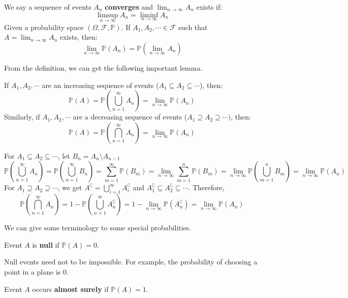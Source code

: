 \documentclass{huhtakm-template-book}
\newcommand{\prob}{\mathbb{P}}
\begin{document}
\begin{defn}
	We say a sequence of events $A_{n}$ \textbf{converges} and $\lim_{n\to\infty}A_{n}$ exists if:
	\begin{equation*}
		\limsup_{n\to\infty}A_{n}=\liminf_{n\to\infty}A_{n}
	\end{equation*}
	Given a probability space $(\Omega,\mathcal{F},\prob)$. If $A_{1},A_{2},\cdots\in\mathcal{F}$ such that $A=\lim_{n\to\infty}A_{n}$ exists, then:
	\begin{equation*}
		\lim_{n\to\infty}\prob(A_{n})=\prob\left(\lim_{n\to\infty}A_{n}\right)
	\end{equation*}
\end{defn}
From the definition, we can get the following important lemma.
\begin{lem}
	\label{Chapter 2 (Lemma) Continuous probability}
	If $A_{1},A_{2},\cdots$ are an increasing sequence of events ($A_{1}\subseteq A_{2}\subseteq\cdots$), then:
	\begin{equation*}
		\prob(A)=\prob\left(\bigcup_{n=1}^{\infty}A_{n}\right)=\lim_{n\to\infty}\prob(A_{n})
	\end{equation*}
	Similarly, if $A_{1},A_{2},\cdots$ are a decreasing sequence of events ($A_{1}\supseteq A_{2}\supseteq\cdots)$, then:
	\begin{equation*}
		\prob(A)=\prob\left(\bigcap_{n=1}^{\infty}A_{n}\right)=\lim_{n\to\infty}\prob(A_{n})
	\end{equation*}
\end{lem}
\begin{proofing}
	For $A_{1}\subseteq A_{2}\subseteq\cdots$, let $B_{n}=A_{n}\setminus A_{n-1}$
	\begin{equation*}
		\prob\left(\bigcup_{n=1}^{\infty}A_{n}\right)=\prob\left(\bigcup_{n=1}^{\infty}B_{n}\right)=\sum_{m=1}^{\infty}\prob(B_{m})=\lim_{n\to\infty}\sum_{m=1}^{n}\prob(B_{m})=\lim_{n\to\infty}\prob\left(\bigcup_{m=1}^{n}B_{m}\right)=\lim_{n\to\infty}\prob(A_{n})
	\end{equation*}
	For $A_{1}\supseteq A_{2}\supseteq\cdots$, we get $A^{\complement}=\bigcup_{i=1}^{\infty}A_{i}^{\complement}$ and $A_{1}^{\complement}\subseteq A_{2}^{\complement}\subseteq\cdots$. Therefore,
	\begin{equation*}
		\prob\left(\bigcap_{n=1}^{\infty}A_{n}\right)=1-\prob\left(\bigcup_{n=1}^{\infty}A_{n}^{\complement}\right)=1-\lim_{n\to\infty}\prob(A_{n}^{\complement})=\lim_{n\to\infty}\prob(A_{n})
	\end{equation*}
\end{proofing}
We can give some terminology to some special probabilities.
\begin{defn}
	Event $A$ is \textbf{null} if $\prob(A)=0$.
\end{defn}
\begin{rem}
	Null events need not to be impossible. For example, the probability of choosing a point in a plane is $0$.
\end{rem}
\begin{defn}
	Event $A$ occurs \textbf{almost surely} if $\prob(A)=1$.
\end{defn}
\end{document}

